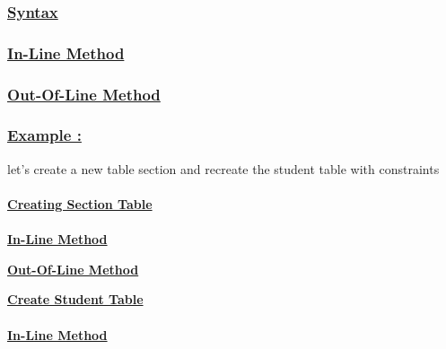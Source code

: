 \vspace{0.5cm}
\subsubsection*{\underline{Syntax}}

\vspace{0.25cm}

\subsubsection*{\underline{In-Line Method}}

\vspace{0.25cm}

\newpage

\subsubsection*{\underline{Out-Of-Line Method}}

\vspace{0.25cm}


\vspace{0.5cm}
\subsubsection*{\underline{Example :}}

\vspace{0.25cm}
let's create a new table section and recreate the student table with constraints\\\\
\textbf{\underline{Creating Section Table}}\\\\
\textbf{\underline{In-Line Method}}

\vspace{0.25cm}


\vspace{0.5cm}
\textbf{\underline{Out-Of-Line Method}}

\vspace{0.25cm}



\vspace{1cm}
\newpage
\textbf{\underline{Create Student Table}}\\\\
\textbf{\underline{In-Line Method}}

\vspace{0.25cm}


